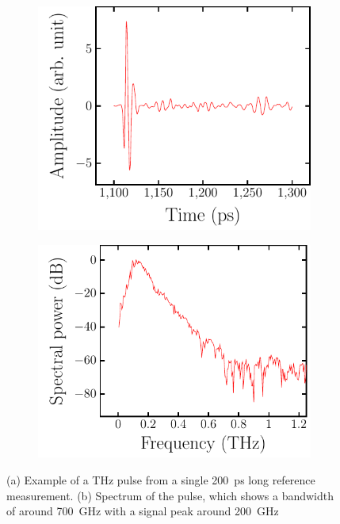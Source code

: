 \begin{figure}[H]
    \begin{subfigure}[b]{.5\linewidth}
    \caption{}\label{}
    \centering\includegraphics[scale=0.58]{images/setup/plots/pulse_example_bt_a.pdf}
    \end{subfigure}%
    \begin{subfigure}[b]{.5\linewidth}
    \caption{}\label{}
    \centering\includegraphics[scale=0.58]{images/setup/plots/pulse_example_bt_b.pdf}
    \end{subfigure}
    \caption{(a) Example of a THz pulse from a single \SI{200}{\pico \second} long reference measurement. (b) Spectrum of the pulse, which shows a bandwidth of around \SI{700}{\giga \hertz} with a signal peak around \SI{200}{\giga \hertz}}
    \label{fig:BT_pulse_example}
\end{figure}


